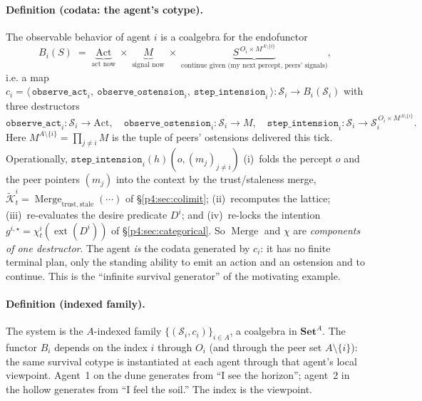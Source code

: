 \documentclass{article}
\newcommand{\method}[1]{\texttt{#1}}
\begin{document}
\paragraph{Definition (codata: the agent's cotype).}
The observable behavior of agent $i$ is a coalgebra for the endofunctor
\[
  B_i(S)\;=\;\underbrace{\mathrm{Act}}_{\text{act now}}\;\times\;
            \underbrace{M}_{\text{signal now}}\;\times\;
            \underbrace{S^{\,O_i\times M^{A\setminus\{i\}}}}_{\text{continue given (my next percept, peers' signals)}},
\]
i.e. a map $c_i=\big\langle\, \method{observe\_act}_i,\ \method{observe\_ostension}_i,\ \method{step\_intension}_i \,\big\rangle : \mathcal{S}_i \to B_i(\mathcal{S}_i)$ with three destructors
\[
  \method{observe\_act}_i:\mathcal{S}_i\to\mathrm{Act},\quad
  \method{observe\_ostension}_i:\mathcal{S}_i\to M,\quad
  \method{step\_intension}_i:\mathcal{S}_i\to \mathcal{S}_i^{\,O_i\times M^{A\setminus\{i\}}} .
\]
Here $M^{A\setminus\{i\}}=\prod_{j\neq i}M$ is the tuple of peers' ostensions
delivered this tick. Operationally, $\method{step\_intension}_i(h)(o,(m_j)_{j\neq i})$
(i)~folds the percept $o$ and the peer pointers $(m_j)$ into the context by
the trust/staleness merge, $\widetilde{\mathcal K}_t^i=\operatorname{Merge}_{\mathrm{trust,stale}}(\cdots)$
of \S\ref{p4:sec:colimit}; (ii)~recomputes the lattice; (iii)~re-evaluates the
desire predicate $D^i$; and (iv)~re-locks the intention
$g^{i,\star}=\chi_t^i(\operatorname{ext}(D^i))$ of \S\ref{p4:sec:categorical}.
So $\operatorname{Merge}$ and $\chi$ are \emph{components of one destructor}.
The agent \emph{is} the codata generated by $c_i$: it has no finite terminal
plan, only the standing ability to emit an action and an ostension and to
continue. This is the ``infinite survival generator'' of the motivating
example.

\paragraph{Definition (indexed family).}
The system is the $A$-indexed family $\{(\mathcal{S}_i,c_i)\}_{i\in A}$, a
coalgebra in $\mathbf{Set}^{A}$. The functor $B_i$ depends on the index $i$
through $O_i$ (and through the peer set $A\setminus\{i\}$): the same survival
cotype is instantiated at each agent through that agent's local viewpoint.
Agent~1 on the dune generates from ``I see the horizon''; agent~2 in the
hollow generates from ``I feel the soil.'' The index is the viewpoint.
\end{document}
